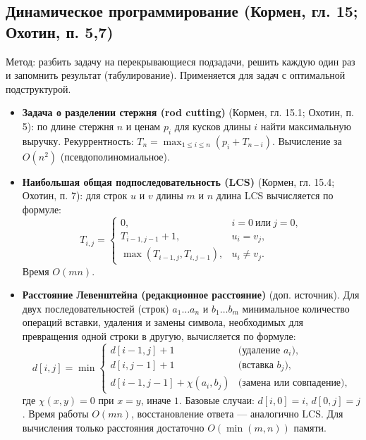 \documentclass[a4paper,12pt]{article}
\begin{document}
\subsection{Динамическое программирование (Кормен, гл. 15; Охотин, п. 5,7)}
Метод: разбить задачу на перекрывающиеся подзадачи, решить каждую один раз и запомнить результат (табулирование). Применяется для задач с оптимальной подструктурой.
\begin{itemize}
    \item \textbf{Задача о разделении стержня (rod cutting)} (Кормен, гл. 15.1; Охотин, п. 5): по длине стержня \( n \) и ценам \( p_i \) для кусков длины \( i \) найти максимальную выручку. Рекуррентность: \( T_n = \max_{1\le i\le n}(p_i + T_{n-i}) \). Вычисление за \( O(n^2) \) (псевдополиномиальное).
    \item \textbf{Наибольшая общая подпоследовательность (LCS)} (Кормен, гл. 15.4; Охотин, п. 7): для строк \( u \) и \( v \) длины \( m \) и \( n \) длина LCS вычисляется по формуле:
    \[
    T_{i,j}=
    \begin{cases}
        0, & i=0\ \text{или}\ j=0,\\
        T_{i-1,j-1}+1, & u_i=v_j,\\
        \max(T_{i-1,j}, T_{i,j-1}), & u_i\neq v_j.
    \end{cases}
    \]
    Время \( O(mn) \).
    \item \textbf{Расстояние Левенштейна (редакционное расстояние)} (доп. источник). Для двух последовательностей (строк) \( a_1\ldots a_n \) и \( b_1\ldots b_m \) минимальное количество операций вставки, удаления и замены символа, необходимых для превращения одной строки в другую, вычисляется по формуле:
    \[
    d[i,j] = \min \begin{cases}
        d[i-1,j] + 1 & \text{(удаление } a_i\text{)},\\
        d[i,j-1] + 1 & \text{(вставка } b_j\text{)},\\
        d[i-1,j-1] + \chi(a_i,b_j) & \text{(замена или совпадение)},
    \end{cases}
    \]
    где \( \chi(x,y)=0 \) при \( x=y \), иначе \( 1 \). Базовые случаи: \( d[i,0]=i \), \( d[0,j]=j \). Время работы \( O(mn) \), восстановление ответа --- аналогично LCS. Для вычисления только расстояния достаточно \( O(\min(m,n)) \) памяти.
\end{itemize}
\end{document}
